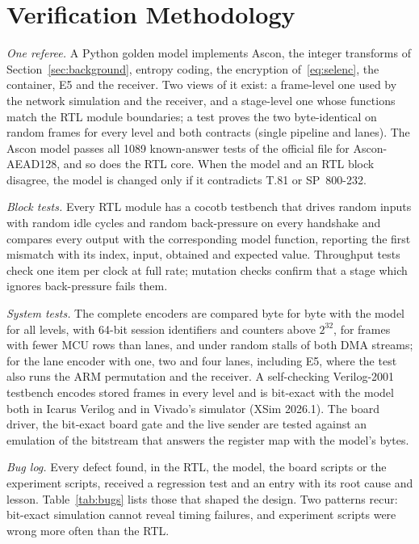 \section{Verification Methodology}\label{sec:verification}
\textit{One referee.} A Python golden model implements Ascon, the integer transforms of Section~\ref{sec:background}, entropy coding, the encryption of~\eqref{eq:selenc}, the container, E5 and the receiver. Two views of it exist: a frame-level one used by the network simulation and the receiver, and a stage-level one whose functions match the RTL module boundaries; a test proves the two byte-identical on random frames for every level and both contracts (single pipeline and lanes). The Ascon model passes all 1089 known-answer tests of the official file for Ascon-AEAD128, and so does the RTL core. When the model and an RTL block disagree, the model is changed only if it contradicts T.81 or SP~800-232.

\textit{Block tests.} Every RTL module has a cocotb testbench that drives random inputs with random idle cycles and random back-pressure on every handshake and compares every output with the corresponding model function, reporting the first mismatch with its index, input, obtained and expected value. Throughput tests check one item per clock at full rate; mutation checks confirm that a stage which ignores back-pressure fails them.

\textit{System tests.} The complete encoders are compared byte for byte with the model for all levels, with 64-bit session identifiers and counters above $2^{32}$, for frames with fewer MCU rows than lanes, and under random stalls of both DMA streams; for the lane encoder with one, two and four lanes, including E5, where the test also runs the ARM permutation and the receiver. A self-checking Verilog-2001 testbench encodes stored frames in every level and is bit-exact with the model both in Icarus Verilog and in Vivado's simulator (XSim 2026.1). The board driver, the bit-exact board gate and the live sender are tested against an emulation of the bitstream that answers the register map with the model's bytes.

\textit{Bug log.} Every defect found, in the RTL, the model, the board scripts or the experiment scripts, received a regression test and an entry with its root cause and lesson. Table~\ref{tab:bugs} lists those that shaped the design. Two patterns recur: bit-exact simulation cannot reveal timing failures, and experiment scripts were wrong more often than the RTL.

